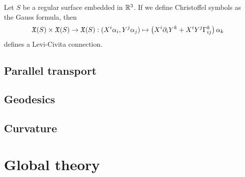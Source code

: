\documentclass{../exp}
\def\a{\alpha}
\begin{document}
\begin{prop}
Let $S$ be a regular surface embedded in $\mathbb{R}^3$.
If we define Christoffel symbols as the Gauss formula, then
\[\fX(S)\x\fX(S)\to\fX(S):(X^i\a_i,Y^j\a_j)\mapsto\left(X^i\pd_iY^k+X^iY^j\Gamma_{ij}^k\right)\a_k\]
defines a Levi-Civita connection.
\end{prop}




\subsection{Parallel transport}



\subsection{Geodesics}

\subsection{Curvature}



\section{Global theory}

\end{document}
